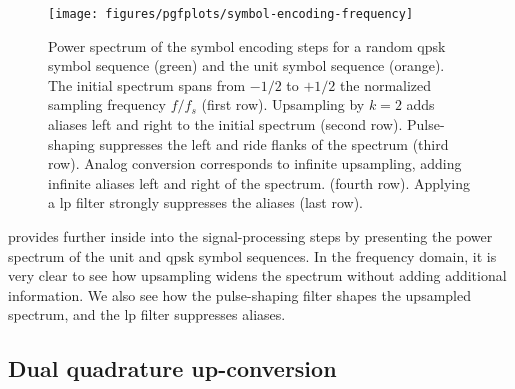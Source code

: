 \begin{figure}[htb]
	\centering
	\texttt{[image: figures/pgfplots/symbol-encoding-frequency]}
	\caption{Power spectrum of the symbol encoding steps for a random \gls{qpsk} symbol sequence (green) and the unit symbol sequence (orange). The initial spectrum spans from $-1/2$ to $+1/2$ the normalized sampling frequency $f/f_s$ (first row). Upsampling by $k=2$ adds aliases left and right to the initial spectrum (second row). Pulse-shaping suppresses the left and ride flanks of the spectrum (third row). Analog conversion corresponds to infinite upsampling, adding infinite aliases left and right of the spectrum. (fourth row). Applying a \gls{lp} filter strongly suppresses the aliases (last row).}\label{fig:baseband_construction_freq}
\end{figure}
 provides further inside into the signal-processing steps by presenting the power spectrum of the unit and \gls{qpsk} symbol sequences.
In the frequency domain, it is very clear to see how upsampling widens the spectrum without adding additional information.
We also see how the pulse-shaping filter shapes the upsampled spectrum, and the \gls{lp} filter suppresses aliases.

\FloatBarrier
\subsection{Dual quadrature up-conversion}

